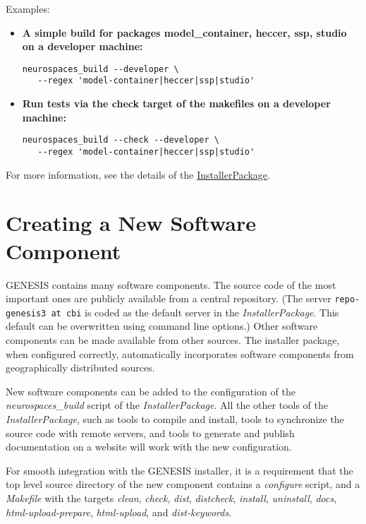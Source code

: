 \documentclass[12pt]{article}
\begin{document}
Examples:

\begin{itemize}

\item {\bf A simple build for packages model\_container, heccer, ssp, studio on a developer machine:}
\begin{verbatim}
neurospaces_build --developer \
   --regex 'model-container|heccer|ssp|studio'
\end{verbatim}

\item {\bf Run tests via the check target of the makefiles on a developer machine:}
\begin{verbatim}
neurospaces_build --check --developer \
   --regex 'model-container|heccer|ssp|studio'
\end{verbatim}
\end{itemize}

For more information, see the details of the \href{../installer-package/installer-package.tex}{InstallerPackage}. 

\section*{Creating a New Software Component}

GENESIS contains many software components. The source code of the most important ones are publicly available from a central repository. (The server {\tt repo-genesis3 at cbi} is coded as the default server in the {\it InstallerPackage}. This default can be overwritten using command line options.) Other software components can be made available from other sources. The installer package, when configured correctly, automatically incorporates software components from geographically distributed sources.

New software components can be added to the configuration of the {\it neurospaces\_build} script of the {\it InstallerPackage}. All the other tools of the {\it InstallerPackage}, such as tools to compile and install, tools to synchronize the source code with remote servers, and tools to generate and publish documentation on a website will work with the new configuration.

For smooth integration with the GENESIS installer, it is a requirement that the top level source directory of the new component contains a {\it configure} script, and a {\it Makefile} with the targets {\it clean}, {\it check}, {\it dist}, {\it distcheck}, {\it install}, {\it uninstall}, {\it docs}, {\it html-upload-prepare}, {\it html-upload}, and {\it dist-keywords}.
\end{document}
